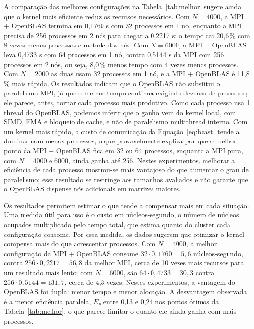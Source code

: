 \documentclass[Portugues]{ic-tese-v3}
\DeclareRobustCommand{\_}{\textunderscore\allowbreak} %
\begin{document}
A comparação das melhores configurações na Tabela~\ref{tab:melhor} sugere ainda que o kernel mais eficiente reduz os recursos necessários. Com $N=4000$, a MPI + OpenBLAS termina em 0,1760 s com 32 processos em 1 nó, enquanto a MPI precisa de 256 processos em 2 nós para chegar a 0,2217 s: o tempo cai 20,6\,\% com 8 vezes menos processos e metade dos nós. Com $N=6000$, a MPI + OpenBLAS leva 0,4733 s com 64 processos em 1 nó, contra 0,5144 s da MPI com 256 processos em 2 nós, ou seja, 8,0\,\% menos tempo com 4 vezes menos processos. Com $N=2000$ as duas usam 32 processos em 1 nó, e a MPI + OpenBLAS é 11,8\,\% mais rápida. Os resultados indicam que o OpenBLAS não substitui o paralelismo MPI, já que o melhor tempo continua exigindo dezenas de processos; ele parece, antes, tornar cada processo mais produtivo. Como cada processo usa 1 thread do OpenBLAS, podemos inferir que o ganho vem do kernel local, com SIMD, FMA e bloqueio de cache, e não de paralelismo multithread interno. Com um kernel mais rápido, o custo de comunicação da Equação~\eqref{eq:bcast} tende a dominar com menos processos, o que provavelmente explica por que o melhor ponto da MPI + OpenBLAS fica em 32 ou 64 processos, enquanto a MPI pura, com $N=4000$ e 6000, ainda ganha até 256. Nestes experimentos, melhorar a eficiência de cada processo mostrou-se mais vantajoso do que aumentar o grau de paralelismo; esse resultado se restringe aos tamanhos avaliados e não garante que o OpenBLAS dispense nós adicionais em matrizes maiores.

Os resultados permitem estimar o que tende a compensar mais em cada situação. Uma medida útil para isso é o custo em núcleos-segundo, o número de núcleos ocupados multiplicado pelo tempo total, que estima quanto do cluster cada configuração consome. Por essa medida, os dados sugerem que otimizar o kernel compensa mais do que acrescentar processos. Com $N=4000$, a melhor configuração da MPI + OpenBLAS consome $32\cdot0{,}1760 = 5{,}6$ núcleos-segundo, contra $256\cdot0{,}2217 = 56{,}8$ da melhor MPI, cerca de 10 vezes mais recursos para um resultado mais lento; com $N=6000$, são $64\cdot0{,}4733 = 30{,}3$ contra $256\cdot0{,}5144 = 131{,}7$, cerca de 4,3 vezes. Nestes experimentos, a vantagem do OpenBLAS foi dupla: menor tempo e menor alocação. A desvantagem observada é a menor eficiência paralela, $E_p$ entre 0,13 e 0,24 nos pontos ótimos da Tabela~\ref{tab:melhor}, o que parece limitar o quanto ele ainda ganha com mais processos.
\end{document}
